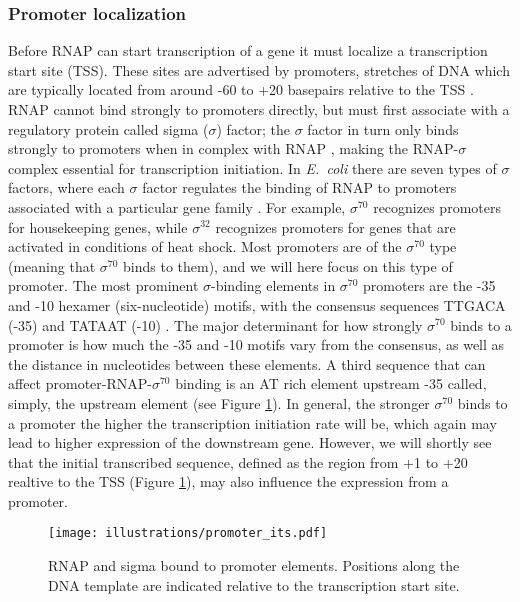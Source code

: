 \subsubsection{Promoter localization}
Before RNAP can start transcription of a gene it must localize a transcription
start site (TSS). These sites are advertised by promoters, stretches of DNA
which are typically located from around -60 to +20 basepairs relative to the
TSS \cite{ross_third_1993,hsu_promoter_2002}. RNAP cannot bind strongly to
promoters directly, but must first associate with a regulatory protein called
sigma ($\sigma$) factor; the $\sigma$ factor in turn only binds strongly to
promoters when in complex with RNAP \cite{paget_70_2003}, making
the RNAP-$\sigma$ complex essential for transcription initiation. In
\textit{E.\ coli} there are seven types of $\sigma$ factors, where each
$\sigma$ factor regulates the binding of RNAP to promoters associated with a
particular gene family \cite{osterberg_regulation_2011}. For example,
$\sigma^{70}$ recognizes promoters for housekeeping genes, while $\sigma^{32}$
recognizes promoters for genes that are activated in conditions of heat shock.
Most promoters are of the $\sigma^{70}$ type (meaning that $\sigma^{70}$ binds
to them), and we will here focus on this type of promoter. The most prominent
$\sigma$-binding elements in $\sigma^{70}$ promoters are the -35 and -10
hexamer (six-nucleotide) motifs, with the consensus sequences TTGACA (-35) and
TATAAT (-10) \cite{ross_analysis_2009}. The major determinant for how strongly
$\sigma^{70}$ binds to a promoter is how much the -35 and -10 motifs vary from
the consensus, as well as the distance in nucleotides between these elements.
A third sequence that can affect promoter-RNAP-$\sigma^{70}$ binding is an AT
rich element upstream -35 called, simply, the upstream element
\cite{ross_third_1993, haugen_fine_2008} (see Figure \ref{fig:promoter}). In
general, the stronger $\sigma^{70}$ binds to a promoter the higher the
transcription initiation rate will be, which again may lead to higher
expression of the downstream gene.  However, we will shortly see that the
initial transcribed sequence, defined as the region from +1 to +20 realtive to
the TSS (Figure \ref{fig:promoter}), may also influence the expression from a
promoter.

\begin{figure}[htb]
	\begin{center}
		\texttt{[image: illustrations/promoter\_its.pdf]}
	\end{center}
	\caption{RNAP and sigma bound to promoter elements. Positions along the DNA
	template are indicated relative to the transcription start site.}
	\label{fig:promoter}
\end{figure}

